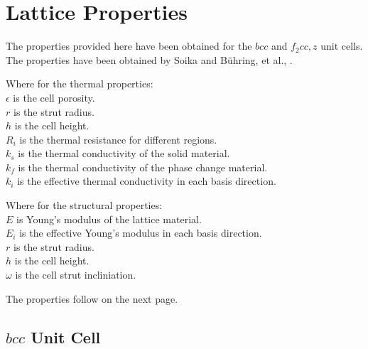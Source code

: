 \chapter{Lattice Properties}
\label{appendix:A}

The properties provided here have been obtained for the $bcc$ and $f_2cc,z$ unit cells. The properties have been obtained by Soika \cite{Piacquadio_Soika_Schirp_Schröder_Filippeschi_2023} and Bühring, et al., \cite{Bühring_Soika_Schirp-Schoenen_Schröder_2022}.

Where for the thermal properties: \\
$\epsilon$ is the cell porosity. \\
$r$ is the strut radius.\\
$h$ is the cell height.\\
$R_i$ is the thermal resistance for different regions.\\
$k_s$ is the thermal conductivity of the solid material. \\
$k_f$ is the thermal conductivity of the phase change material. \\
$k_i$ is the effective thermal conductivity in each basis direction.

Where for the structural properties: \\
$E$ is Young's modulus of the lattice material. \\
$E_i$ is the effective Young's modulus in each basis direction. \\
$r$ is the strut radius. \\
$h$ is the cell height. \\
$\omega$ is the cell strut incliniation.

The properties follow on the next page.

\vfill \pagebreak
\section*{$bcc$ Unit Cell}
